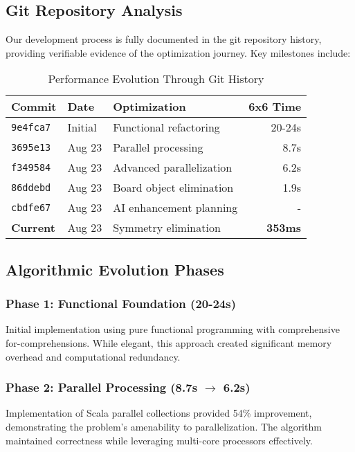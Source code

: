 \documentclass[12pt,a4paper]{article}
\theoremstyle{definition}
\begin{document}
\subsection{Git Repository Analysis}

Our development process is fully documented in the git repository history, providing verifiable evidence of the optimization journey. Key milestones include:

\begin{table}[h]
\centering
\caption{Performance Evolution Through Git History}
\begin{tabular}{@{}lllr@{}}
\toprule
Commit & Date & Optimization & 6x6 Time \\
\midrule
\texttt{9e4fca7} & Initial & Functional refactoring & 20-24s \\
\texttt{3695e13} & Aug 23 & Parallel processing & 8.7s \\
\texttt{f349584} & Aug 23 & Advanced parallelization & 6.2s \\
\texttt{86ddebd} & Aug 23 & Board object elimination & 1.9s \\
\texttt{cbdfe67} & Aug 23 & AI enhancement planning & - \\
\textbf{Current} & Aug 23 & Symmetry elimination & \textbf{353ms} \\
\bottomrule
\end{tabular}
\end{table}

\subsection{Algorithmic Evolution Phases}

\subsubsection{Phase 1: Functional Foundation (20-24s)}
Initial implementation using pure functional programming with comprehensive for-comprehensions. While elegant, this approach created significant memory overhead and computational redundancy.

\subsubsection{Phase 2: Parallel Processing (8.7s \texorpdfstring{$\rightarrow$}{->} 6.2s)}
Implementation of Scala parallel collections provided 54\% improvement, demonstrating the problem's amenability to parallelization. The algorithm maintained correctness while leveraging multi-core processors effectively.
\end{document}
